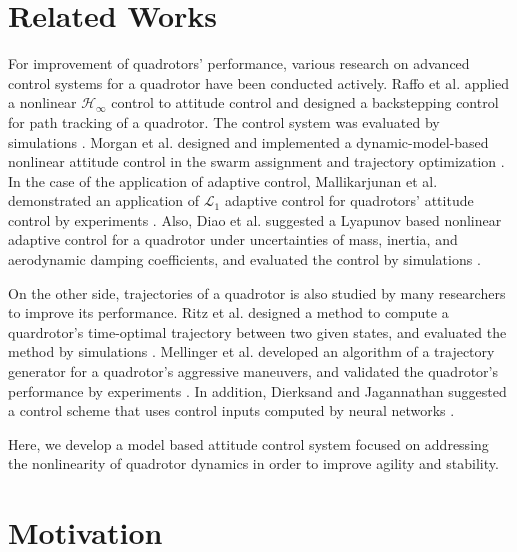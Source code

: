 \section{Related Works}
For improvement of quadrotors' performance, various research on advanced control systems for a quadrotor have been conducted actively. Raffo et al. applied a nonlinear \({\mathscr{H}}_{\infty}\) control to attitude control and designed a backstepping control for path tracking of a quadrotor. The control system was evaluated by simulations \cite{Raffo08}. %
Morgan et al. designed and implemented a dynamic-model-based nonlinear attitude control in the swarm assignment and trajectory optimization \cite{Morgan16}. %
In the case of the application of adaptive control, Mallikarjunan et al. demonstrated an application of \({\mathscr{L}}_{1}\)  adaptive control for quadrotors' attitude control by experiments \cite{Mallikarjunan12}. %
Also, Diao et al. suggested a Lyapunov based nonlinear adaptive control for a quadrotor under uncertainties of mass, inertia, and aerodynamic damping coefficients, and evaluated the control by simulations \cite{Diao11}. %

On the other side, trajectories of a quadrotor is also studied by many researchers to improve its performance. 
Ritz et al. designed a method to compute a quardrotor's time-optimal trajectory between two given states, and evaluated the method by simulations \cite{Ritz11}.
Mellinger et al. developed an algorithm of a trajectory generator for a quadrotor's aggressive maneuvers, and validated the quadrotor's performance by experiments \cite{Mellinger12}.
In addition, Dierksand and Jagannathan suggested a control scheme that uses control inputs computed by neural networks \cite{Dierks10}. %

Here, we develop a model based attitude control system focused on addressing the nonlinearity of quadrotor dynamics in order to improve agility and stability.

\section{Motivation}

